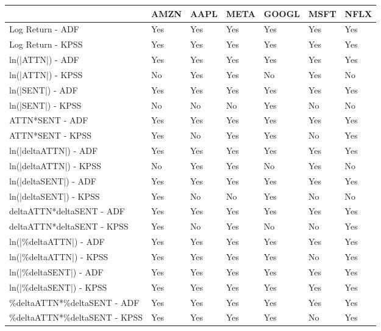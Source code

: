 \begin{tabular}{lllllll}
\toprule
{} & AMZN & AAPL & META & GOOGL & MSFT & NFLX \\
\midrule
Log Return - ADF             &  Yes &  Yes &  Yes &   Yes &  Yes &  Yes \\
Log Return - KPSS            &  Yes &  Yes &  Yes &   Yes &  Yes &  Yes \\
ln(|ATTN|) - ADF             &  Yes &  Yes &  Yes &   Yes &  Yes &  Yes \\
ln(|ATTN|) - KPSS            &   No &  Yes &  Yes &    No &  Yes &   No \\
ln(|SENT|) - ADF             &  Yes &  Yes &  Yes &   Yes &  Yes &  Yes \\
ln(|SENT|) - KPSS            &   No &   No &   No &   Yes &   No &   No \\
ATTN*SENT - ADF              &  Yes &  Yes &  Yes &   Yes &  Yes &  Yes \\
ATTN*SENT - KPSS             &  Yes &   No &  Yes &   Yes &   No &  Yes \\
ln(|deltaATTN|) - ADF        &  Yes &  Yes &  Yes &   Yes &  Yes &  Yes \\
ln(|deltaATTN|) - KPSS       &   No &  Yes &  Yes &    No &  Yes &   No \\
ln(|deltaSENT|) - ADF        &  Yes &  Yes &  Yes &   Yes &  Yes &  Yes \\
ln(|deltaSENT|) - KPSS       &  Yes &   No &   No &   Yes &   No &   No \\
deltaATTN*deltaSENT - ADF    &  Yes &  Yes &  Yes &   Yes &  Yes &  Yes \\
deltaATTN*deltaSENT - KPSS   &  Yes &   No &  Yes &    No &   No &  Yes \\
ln(|\%deltaATTN|) - ADF       &  Yes &  Yes &  Yes &   Yes &  Yes &  Yes \\
ln(|\%deltaATTN|) - KPSS      &  Yes &  Yes &  Yes &   Yes &   No &  Yes \\
ln(|\%deltaSENT|) - ADF       &  Yes &  Yes &  Yes &   Yes &  Yes &  Yes \\
ln(|\%deltaSENT|) - KPSS      &  Yes &  Yes &  Yes &   Yes &  Yes &  Yes \\
\%deltaATTN*\%deltaSENT - ADF  &  Yes &  Yes &  Yes &   Yes &  Yes &  Yes \\
\%deltaATTN*\%deltaSENT - KPSS &  Yes &  Yes &  Yes &   Yes &   No &  Yes \\
\bottomrule
\end{tabular}
